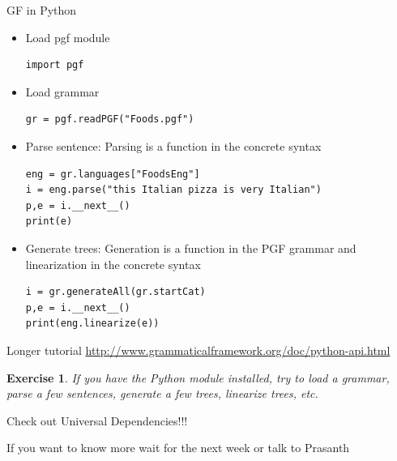 \documentclass{beamer}
\newtheorem{exercise}{Exercise}
\begin{document}
\begin{frame}[fragile]{GF in Python}
  \begin{itemize}
  \item Load pgf module
\begin{verbatim}
import pgf
\end{verbatim}
\item Load grammar
\begin{verbatim}
gr = pgf.readPGF("Foods.pgf")
\end{verbatim}
\item Parse sentence: Parsing is a function in the concrete syntax
\begin{verbatim}
eng = gr.languages["FoodsEng"]
i = eng.parse("this Italian pizza is very Italian")
p,e = i.__next__()
print(e)
\end{verbatim}
\item Generate trees: Generation is a function in the PGF grammar and linearization in the concrete syntax
\begin{verbatim}
i = gr.generateAll(gr.startCat)
p,e = i.__next__()
print(eng.linearize(e))
\end{verbatim}
  \end{itemize}
  Longer tutorial \url{http://www.grammaticalframework.org/doc/python-api.html}
\end{frame}
\begin{frame}
  \begin{exercise}
    If you have the Python module installed, try to load a grammar, parse a few sentences, generate a few trees, linearize trees, etc.
  \end{exercise}
\end{frame}

\begin{frame}
  Check out Universal Dependencies!!!

  If you want to know more wait for the next week or talk to Prasanth
\end{frame}
\end{document}
